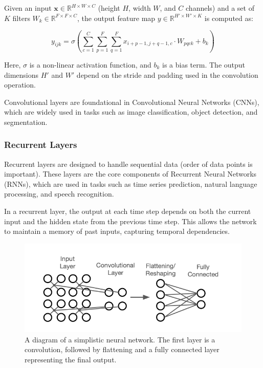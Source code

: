 Given an input \( \bm{x} \in \mathbb{R}^{H \times W \times C} \) (height \( H \), width \( W \), and \( C \) channels) and a set of \( K \) filters \( W_k \in \mathbb{R}^{F \times F \times C} \), the output feature map \( y \in \mathbb{R}^{H' \times W' \times K} \) is computed as:

\[
    y_{ijk} = \sigma \left( \sum_{c=1}^{C} \sum_{p=1}^{F} \sum_{q=1}^{F} x_{i+p-1, j+q-1, c} \cdot W_{pqck} + b_k \right)
\]

Here, \( \sigma \) is a non-linear activation function, and \( b_k \) is a bias term. The output dimensions \( H' \) and \( W' \) depend on the stride and padding used in the convolution operation. 

Convolutional layers are foundational in Convolutional Neural Networks (CNNs), which are widely used in tasks such as image classification, object detection, and segmentation.


\subsubsection{Recurrent Layers}

Recurrent layers are designed to handle sequential data (order of data points is important). These layers are the core components of Recurrent Neural Networks (RNNs), which are used in tasks such as time series prediction, natural language processing, and speech recognition. \bigskip

In a recurrent layer, the output at each time step depends on both the current input and the hidden state from the previous time step. This allows the network to maintain a memory of past inputs, capturing temporal dependencies.

\begin{figure}[h]
    \centering
    \includegraphics[width=1\textwidth]{img/4_fully_connected.png}
    \caption{A diagram of a simplistic neural network. The first layer is a convolution, followed by flattening and a fully connected layer representing the final output.}
\end{figure}

